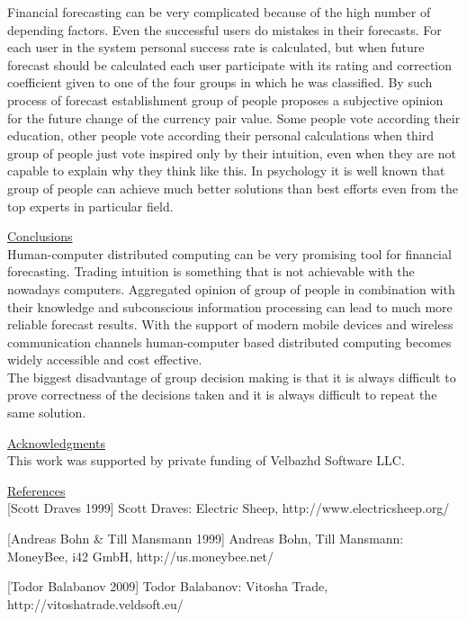 \documentclass{article}
\begin{document}
Financial forecasting can be very complicated because of the high number of depending factors. Even the successful users do mistakes in their forecasts. For each user in the system personal success rate is calculated, but when future forecast should be calculated each user participate with its rating and correction coefficient given to one of the four groups in which he was classified. By such process of forecast establishment group of people proposes a subjective opinion for the future change of the currency pair value. Some people vote according their education, other people vote according their personal calculations when third group of people just vote inspired only by their intuition, even when they are not capable to explain why they think like this. In psychology it is well known that group of people can achieve much better solutions than best efforts even from the top experts in particular field. 

\vspace*{3mm}
\underline{Conclusions} \\

Human-computer distributed computing can be very promising tool for financial forecasting. Trading intuition is something that is not achievable with the nowadays computers. Aggregated opinion of group of people in combination with their knowledge and subconscious information processing can lead to much more reliable forecast results. With the support of modern mobile devices and wireless communication channels human-computer based distributed computing becomes widely accessible and cost effective. \\

The biggest disadvantage of group decision making is that it is always difficult to prove correctness of the decisions taken and it is always difficult to repeat the same solution. 

\vspace*{3mm}
\underline{Acknowledgments} \\

This work was supported by private funding of Velbazhd Software LLC.

\vspace*{3mm}
\underline{References} \\

[Scott Draves 1999] Scott Draves: Electric Sheep, http://www.electricsheep.org/

[Andreas Bohn \& Till Mansmann 1999] Andreas Bohn, Till Mansmann: MoneyBee, i42 GmbH, http://us.moneybee.net/

[Todor Balabanov 2009] Todor Balabanov: Vitosha Trade, http://vitoshatrade.veldsoft.eu/
\end{document}
